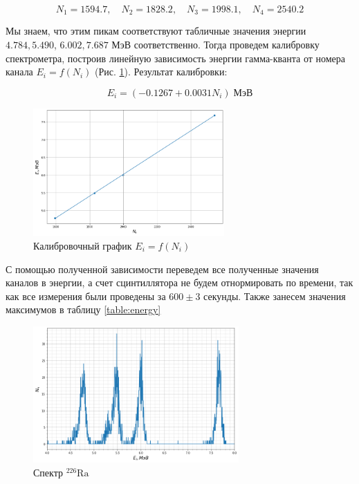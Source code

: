 \documentclass[11.5pt,a4paper,russian]{article}
\begin{document}
\begin{equation}\label{}
	N_1 = 1594.7, \quad N_2 = 1828.2, \quad N_3 = 1998.1, \quad N_4 = 2540.2
\end{equation}

Мы знаем, что этим пикам соответствуют табличные значения энергии $4.784, 5.490$, $6.002, 7.687$ МэВ соответственно. Тогда проведем калибровку спектрометра, построив линейную зависимость энергии гамма-кванта от номера канала $E_i = f(N_i)$ (Рис. \ref{fig:calib}). Результат калибровки:

\begin{equation}
	E_i = (-0.1267 + 0.0031N_i ) \; \text{МэВ}
\end{equation}
\begin{figure}[h!]
\centering
\includegraphics[width=0.65\textwidth]{05cdfd8e-505f-4549-8864-26c91e3d9761}
\caption{Калибровочный график $E_i = f(N_i)$}
\label{fig:calib}
\end{figure}

С помощью полученной зависимости переведем все полученные значения каналов в энергии, а счет сцинтиллятора не будем отнормировать по времени, так как все измерения были проведены за $600 \pm 3$ секунды. Также занесем значения максимумов в таблицу \ref{table:energy}

\begin{figure}[h!]
\centering
\includegraphics[width=0.7\textwidth]{c199c04d-a769-427b-b585-fb9c75c84bc0}
\caption{Спектр ${ }^{226} \mathrm{Ra}$}
\end{figure}
\end{document}
